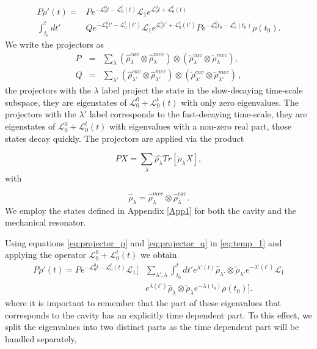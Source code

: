 \documentclass[reprint, amsmath,amssymb, aps,pra]{revtex4-1}
\begin{document}
\begin{align}\label{eq:temp_1}
P\dot{\rho}'(t)=&P e^{-\mathcal{L}_0^0 t-\mathcal{L}_0^t(t)}\mathcal{L}_1e^{\mathcal{L}_0^0 t+\mathcal{L}_0^t(t)}\\
\int_{t_0}^{t}dt'&Qe^{-\mathcal{L}_0^0 t'-\mathcal{L}_0^t(t')}\mathcal{L}_1e^{\mathcal{L}_0^0 t'+\mathcal{L}_0^t(t')}Pe^{-\mathcal{L}_0^0 t_0-\mathcal{L}_0^t(t_0)}\rho(t_0).\nonumber
\end{align} We write the projectors as
\begin{eqnarray}
  P &=& \sum_{\lambda} (\hat{\rho}_{\lambda}^{cav}\otimes\hat{\rho}_{\lambda}^{mec})\otimes(\check{\rho}_{\lambda}^{cav}\otimes\check{\rho}_{\lambda}^{mec}),\label{eq:projector_p}\\
  Q &=& \sum_{\lambda'} (\hat{\rho}_{\lambda'}^{cav}\otimes \hat{\rho}_{\lambda'}^{mec})\otimes(\check{\rho}_{\lambda'}^{cav}\otimes\check{\rho}_{\lambda'}^{mec})\label{eq:projector_q}\, ,
\end{eqnarray}
the projectors with the $\lambda$ label project the state in the
slow-decaying time-scale subspace, they are eigenstates of
$\mathcal{L}_0^0+\mathcal{L}_0^t(t)$ with only zero eigenvalues. The projectors with the
$\lambda'$ label corresponds to the fast-decaying time-scale, they are
eigenstates of $\mathcal{L}_0^0+\mathcal{L}_0^t(t)$ with eigenvalues with a non-zero real
part, those states decay quickly. The projectors are applied via the product

\begin{equation}
PX =\sum_\lambda \hat{\rho_{\lambda}}Tr[\check{\rho}_{\lambda}X],
\end{equation} with

\begin{equation}
\hat{\rho}_\lambda = \hat{\rho}_\lambda^{mec} \otimes  \hat{\rho}_\lambda^{cav}.
\end{equation} We employ the states defined in Appendix
\ref{App1} for both the cavity and the mechanical resonator. 

Using equations \eqref{eq:projector_p} and \eqref{eq:projector_q} in
\eqref{eq:temp_1} and applying the operator $\mathcal{L}_0^0+\mathcal{L}_0^t(t)$ we obtain
\begin{align}\label{ProyectionEQ}
P\dot{\rho}'(t)=P e^{-\mathcal{L}_0^0 t-\mathcal{L}_0^t(t)}\mathcal{L}_1[&\sum_{\lambda',\lambda}\int_{t_0}^{t}dt'e^{\lambda'(t)} \hat{\rho}_{\lambda'} \otimes \check{\rho}_{\lambda'}e^{-\lambda'(t')}\mathcal{L}_1\\
&e^{\lambda(t')}\hat{\rho}_{\lambda} \otimes \check{\rho}_{\lambda} e^{-\lambda (t_0)}\rho(t_0)]\nonumber.
\end{align} where it is important to remember that the part of these eigenvalues that corresponds to the cavity has an explicitly time dependent part. To this effect, we split the eigenvalues into two distinct parts as the time dependent part will be handled separately,
\end{document}
